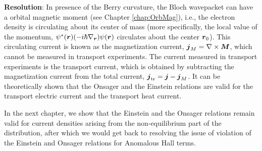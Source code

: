 \documentclass{report}
\renewcommand\vec[1]{\ensuremath\boldsymbol{#1}} %
\begin{document}
\textbf{Resolution}: In presence of the Berry curvature, the Bloch wavepacket can have a orbital magnetic moment (see Chapter \ref{chap:OrbMag}), i.e., the electron density is circulating about its center of mass (more specifically, the local value of the momentum, $\psi^*(\vec{r}) (-i \hbar \nabla_{\vec{r}}) \psi(\vec{r})$ circulates about the center $\vec{r}_0$). This circulating current is known as the magnetization current, $\vec{j}_M = \nabla \times \vec{M}$, which cannot be measured in transport experiments. The current measured in transport experiments is the transport current, which is obtained by subtracting the magnetization current from the total current, $\vec{j}_{\text{tr}} = \vec{j} - \vec{j}_M$. It can be theoretically shown that the Onsager and the Einstein relations are valid for the transport electric current and the transport heat current.

In the next chapter, we show that the Einstein and the Onsager relations remain valid for current densities arising from the non-equilibrium part of the distribution, after which we would get back to resolving the issue of violation of the Einstein and Onsager relations for Anomalous Hall terms.
\end{document}
